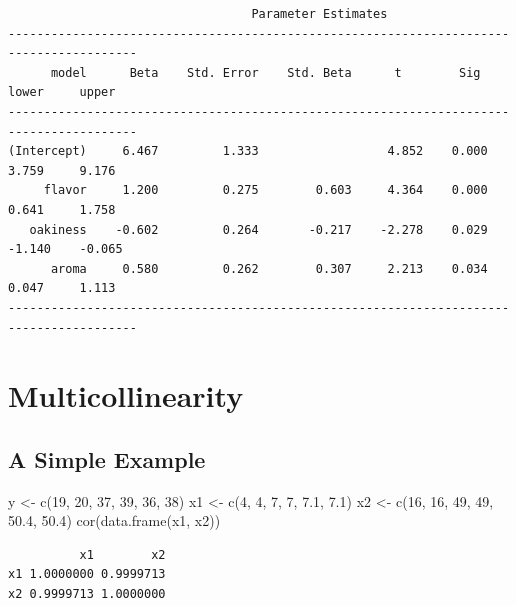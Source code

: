 \documentclass[
  letterpaper,
]{scrbook}
\newenvironment{Shaded}{\begin{snugshade}}{\end{snugshade}}
\newcommand{\DecValTok}[1]{\textcolor[rgb]{0.68,0.00,0.00}{#1}}
\newcommand{\FloatTok}[1]{\textcolor[rgb]{0.68,0.00,0.00}{#1}}
\newcommand{\FunctionTok}[1]{\textcolor[rgb]{0.28,0.35,0.67}{#1}}
\newcommand{\NormalTok}[1]{\textcolor[rgb]{0.00,0.23,0.31}{#1}}
\newcommand{\OtherTok}[1]{\textcolor[rgb]{0.00,0.23,0.31}{#1}}
\begin{document}
\begin{verbatim}
                                  Parameter Estimates                                    
----------------------------------------------------------------------------------------
      model      Beta    Std. Error    Std. Beta      t        Sig      lower     upper 
----------------------------------------------------------------------------------------
(Intercept)     6.467         1.333                  4.852    0.000     3.759     9.176 
     flavor     1.200         0.275        0.603     4.364    0.000     0.641     1.758 
   oakiness    -0.602         0.264       -0.217    -2.278    0.029    -1.140    -0.065 
      aroma     0.580         0.262        0.307     2.213    0.034     0.047     1.113 
----------------------------------------------------------------------------------------
\end{verbatim}

\section{Multicollinearity}\label{multicollinearity}

\subsection{A Simple Example}\label{a-simple-example}

\begin{Shaded}
\begin{Highlighting}[]
\NormalTok{y }\OtherTok{\textless{}{-}} \FunctionTok{c}\NormalTok{(}\DecValTok{19}\NormalTok{, }\DecValTok{20}\NormalTok{, }\DecValTok{37}\NormalTok{, }\DecValTok{39}\NormalTok{, }\DecValTok{36}\NormalTok{, }\DecValTok{38}\NormalTok{)}
\NormalTok{x1 }\OtherTok{\textless{}{-}} \FunctionTok{c}\NormalTok{(}\DecValTok{4}\NormalTok{, }\DecValTok{4}\NormalTok{, }\DecValTok{7}\NormalTok{, }\DecValTok{7}\NormalTok{, }\FloatTok{7.1}\NormalTok{, }\FloatTok{7.1}\NormalTok{)}
\NormalTok{x2 }\OtherTok{\textless{}{-}} \FunctionTok{c}\NormalTok{(}\DecValTok{16}\NormalTok{, }\DecValTok{16}\NormalTok{, }\DecValTok{49}\NormalTok{, }\DecValTok{49}\NormalTok{, }\FloatTok{50.4}\NormalTok{, }\FloatTok{50.4}\NormalTok{)}
\FunctionTok{cor}\NormalTok{(}\FunctionTok{data.frame}\NormalTok{(x1, x2))}
\end{Highlighting}
\end{Shaded}

\begin{verbatim}
          x1        x2
x1 1.0000000 0.9999713
x2 0.9999713 1.0000000
\end{verbatim}
\end{document}
